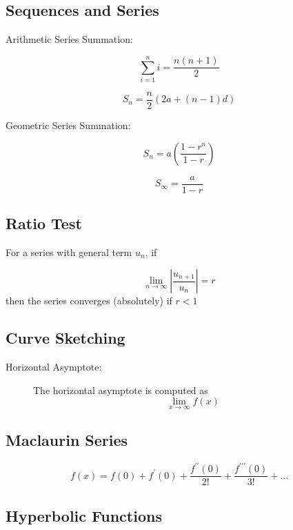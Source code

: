 ﻿ \documentclass[a4paper,12pt]{article}
\begin{document}
	
	\subsection*{Sequences and Series}
Arithmetic Series Summation:
\begin{multicols}{2}	
	\[ \sum_{i=1}^{n} i = \frac{n(n+1)}{2}\]
	

	\[ S_n = \frac{n}{2} \left(2a + (n-1) d \right)\]
\end{multicols}	
	Geometric Series Summation:
	\begin{multicols}{2}
	\[ S_n = a\left(\frac{1-r^n}{1-r}\right)\]
	
	\[ S_\infty = \frac{a}{1-r}\]
	\end{multicols}
	
	
	\subsection*{Ratio Test}
	
	For a series with general term $u_n$, if
	
	\[ \lim_{n \to \infty } \left| \frac{u_{n+1}}{u_n} \right| = r\]
	then the series converges (absolutely) if $r<1$
	
	
	
	
	\subsection*{Curve Sketching}
	\begin{description}
		\item[Horizontal Asymptote:] The horizontal asymptote is computed as
		\[ \lim_{x \to \infty } f(x) \]
	\end{description}
	
	\subsection*{Maclaurin Series}
	\[f(x) = f(0) + f^{\prime}(0) + \frac{f^{\prime \prime}(0)}{2!} + \frac{f^{\prime\prime \prime}(0)}{3!} + \ldots \]
	
	\subsection*{Hyperbolic Functions }
	
\end{document}
